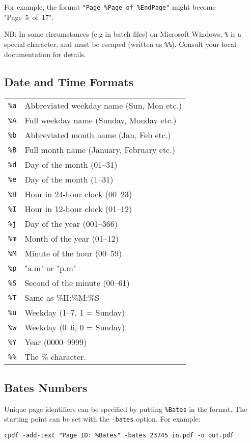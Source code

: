 \documentclass{book}
\begin{document}
  \vspace{2mm}
  \noindent For example, the format \texttt{"Page~\%Page~of~\%EndPage"} might become "Page~5~of~17".

  NB: In some circumstances (e.g in batch files) on Microsoft Windows, \verb!%! is a special character, and must be escaped (written as \verb$%%$). Consult your local documentation for details.

  \subsection{Date and Time Formats}
  \begin{tabular}{ll}
    \texttt{\%a} & Abbreviated weekday name (Sun, Mon etc.)\\
    \texttt{\%A} & Full weekday name (Sunday, Monday etc.)\\
    \texttt{\%b} & Abbreviated month name (Jan, Feb etc.)\\
    \texttt{\%B} & Full month name (January, February etc.)\\
    \texttt{\%d} & Day of the month (01--31) \\
    \texttt{\%e} & Day of the month (1--31) \\
    \texttt{\%H} & Hour in 24-hour clock (00--23)\\
    \texttt{\%I} & Hour in 12-hour clock (01--12)\\
    \texttt{\%j} & Day of the year (001--366)\\
    \texttt{\%m} & Month of the year (01--12)\\
    \texttt{\%M} & Minute of the hour (00--59)\\
    \texttt{\%p} & "a.m" or "p.m"\\
    \texttt{\%S} & Second of the minute (00--61)\\
    \texttt{\%T} & Same as \%H:\%M:\%S\\
    \texttt{\%u} & Weekday (1--7, 1 = Sunday)\\
    \texttt{\%w} & Weekday (0--6, 0 = Sunday)\\
    \texttt{\%Y} & Year (0000--9999)\\
    \texttt{\%\%} & The \% character.
  \end{tabular}

  \subsection{Bates Numbers}
  Unique page identifiers can be specified by putting \verb!%Bates! in the format.
The starting point can be set with the \texttt{-bates} option. For example:
  \begin{framed}
    \small\verb!cpdf -add-text "Page ID: %Bates" -bates 23745 in.pdf -o out.pdf!
  \end{framed}
\end{document}
